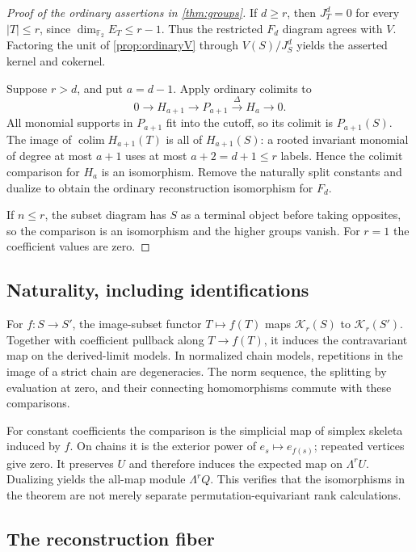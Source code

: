 \documentclass[11pt,a4paper]{article}
\theoremstyle{definition}
\theoremstyle{remark}
\newcommand{\Ftwo}{\mathbb F_2}
\newcommand{\colim}{\operatorname*{colim}}
\begin{document}
\begin{proof}[Proof of the ordinary assertions in \cref{thm:groups}]
If $d\ge r$, then $J_T^d=0$ for every $|T|\le r$, since $\dim_{\Ftwo}E_T\le r-1$. Thus the restricted $F_d$ diagram agrees with $V$. Factoring the unit of \cref{prop:ordinaryV} through $V(S)/J_S^d$ yields the asserted kernel and cokernel.

Suppose $r>d$, and put $a=d-1$. Apply ordinary colimits to
\[
 0\to H_{a+1}\to P_{a+1}\xrightarrow{\Delta}H_a\to0.
\]
All monomial supports in $P_{a+1}$ fit into the cutoff, so its colimit is $P_{a+1}(S)$. The image of $\colim H_{a+1}(T)$ is all of $H_{a+1}(S)$: a rooted invariant monomial of degree at most $a+1$ uses at most $a+2=d+1\le r$ labels. Hence the colimit comparison for $H_a$ is an isomorphism. Remove the naturally split constants and dualize to obtain the ordinary reconstruction isomorphism for $F_d$.

If $n\le r$, the subset diagram has $S$ as a terminal object before taking opposites, so the comparison is an isomorphism and the higher groups vanish. For $r=1$ the coefficient values are zero.
\end{proof}

\subsection{Naturality, including identifications}

For $f:S\to S'$, the image-subset functor $T\mapsto f(T)$ maps $\mathcal K_r(S)$ to $\mathcal K_r(S')$. Together with coefficient pullback along $T\to f(T)$, it induces the contravariant map on the derived-limit models. In normalized chain models, repetitions in the image of a strict chain are degeneracies. The norm sequence, the splitting by evaluation at zero, and their connecting homomorphisms commute with these comparisons.

For constant coefficients the comparison is the simplicial map of simplex skeleta induced by $f$. On chains it is the exterior power of $e_s\mapsto e_{f(s)}$; repeated vertices give zero. It preserves $U$ and therefore induces the expected map on $\Lambda^rU$. Dualizing yields the all-map module $\Lambda^rQ$. This verifies that the isomorphisms in the theorem are not merely separate permutation-equivariant rank calculations.

\subsection{The reconstruction fiber}
\end{document}
